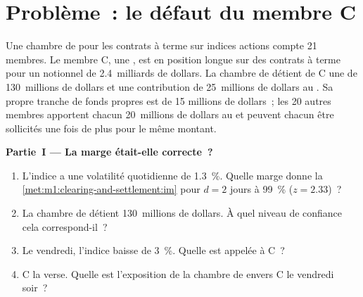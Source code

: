 \section{Problème~: le défaut du membre C}

\begin{problem}\label{pb:m1:clearing-and-settlement:1}
Une chambre de  pour les contrats à terme sur indices actions compte 21 membres. Le membre C, une
, est en position longue sur des contrats à terme pour un notionnel de 2.4~milliards de dollars. La
chambre de  détient de C une  de 130~millions de dollars et une
contribution de 25~millions de dollars au . Sa propre tranche de fonds propres est de 15
millions de dollars~; les 20 autres membres apportent chacun 20~millions de dollars au
 et peuvent chacun être sollicités une fois de plus pour le même montant.

\medskip\noindent\textbf{Partie~I --- La marge était-elle correcte~?}
\begin{enumerate}
\item L'indice a une volatilité quotidienne de 1.3~\%. Quelle marge donne
la \cref{met:m1:clearing-and-settlement:im} pour $d = 2$ jours à 99~\%
($z = 2.33$)~?
\item La chambre de  détient 130~millions de dollars. À quel niveau de confiance
cela correspond-il~?
\item Le vendredi, l'indice baisse de 3~\%. Quelle  est appelée à C~?
\item C la verse. Quelle est l'exposition de la chambre de  envers C le vendredi
soir~?
\end{enumerate}


\end{problem}
